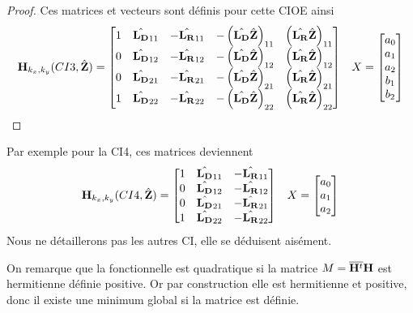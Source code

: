 \begin{proof}
  Ces matrices et vecteurs sont définis pour cette CIOE ainsi
    \begin{align}
        \mathbf{H}_{k_x,k_y}(CI3,\hat{\mathbf{Z}}) = \begin{bmatrix}
        1 & \hat{\mathbf{L_D}}_{11} & -\hat{\mathbf{L_R}}_{11} & -\left(\hat{\mathbf{L_D}}\hat{\mathbf{Z}}\right)_{11} & \left(\hat{\mathbf{L_R}}\hat{\mathbf{Z}}\right)_{11}
        \\
        0 & \hat{\mathbf{L_D}}_{12} & -\hat{\mathbf{L_R}}_{12} & -\left(\hat{\mathbf{L_D}}\hat{\mathbf{Z}}\right)_{12} & \left(\hat{\mathbf{L_R}}\hat{\mathbf{Z}}\right)_{12}
        \\
        0 & \hat{\mathbf{L_D}}_{21} & -\hat{\mathbf{L_R}}_{21} & -\left(\hat{\mathbf{L_D}}\hat{\mathbf{Z}}\right)_{21} & \left(\hat{\mathbf{L_R}}\hat{\mathbf{Z}}\right)_{21}
        \\
        1 & \hat{\mathbf{L_D}}_{22} & -\hat{\mathbf{L_R}}_{22} & -\left(\hat{\mathbf{L_D}}\hat{\mathbf{Z}}\right)_{22} & \left(\hat{\mathbf{L_R}}\hat{\mathbf{Z}}\right)_{22}
        \end{bmatrix}
        && X = \begin{bmatrix} a_0 \\ a_1 \\ a_2 \\ b_1 \\ b_2 \end{bmatrix}
    \end{align}
  \end{proof}

  Par exemple pour la CI4, ces matrices deviennent
  \begin{align}
      \mathbf{H}_{k_x,k_y}(CI4,\hat{\mathbf{Z}}) = \begin{bmatrix}
      1 & \hat{\mathbf{L_D}}_{11} & -\hat{\mathbf{L_R}}_{11}
      \\
      0 & \hat{\mathbf{L_D}}_{12} & -\hat{\mathbf{L_R}}_{12}
      \\
      0 & \hat{\mathbf{L_D}}_{21} & -\hat{\mathbf{L_R}}_{21}
      \\
      1 & \hat{\mathbf{L_D}}_{22} & -\hat{\mathbf{L_R}}_{22}
      \end{bmatrix}
      && X = \begin{bmatrix} a_0 \\ a_1 \\ a_2 \end{bmatrix}
  \end{align}
  Nous ne détaillerons pas les autres CI, elle se déduisent aisément.

  On remarque que la fonctionnelle est quadratique si la matrice \(M={\overline{\mathbf{H}^t}}{\mathbf{H}}\) est hermitienne définie positive. Or par construction elle est hermitienne et positive, donc il existe une minimum global si la matrice est définie.

